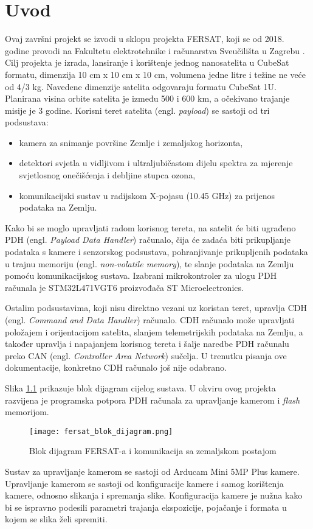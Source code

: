 \chapter{Uvod}

Ovaj završni projekt se izvodi u sklopu projekta FERSAT, koji se od 2018. godine provodi na Fakultetu elektrotehnike i računarstva Sveučilišta u Zagrebu \cite{fersat_stranica_projekta}. Cilj projekta je izrada, lansiranje i korištenje jednog nanosatelita u CubeSat formatu, dimenzija 10 cm x 10 cm x 10 cm, volumena jedne litre i težine ne veće od 4/3 kg. Navedene dimenzije satelita odgovaraju formatu CubeSat 1U. Planirana visina orbite satelita je između 500 i 600 km, a očekivano trajanje misije je 3 godine. Korisni teret satelita (engl. \textit{payload}) se sastoji od tri podsustava:

\begin{itemize}
	\item kamera za snimanje površine Zemlje i zemaljskog horizonta,
	\item detektori svjetla u vidljivom i ultraljubičastom dijelu spektra za mjerenje svjetlosnog onečišćenja i debljine stupca ozona,
	\item komunikacijski sustav u radijskom X-pojasu (10.45 GHz) za prijenos podataka na Zemlju.
\end{itemize}

Kako bi se moglo upravljati radom korisnog tereta, na satelit će biti ugrađeno PDH (engl. \textit{Payload Data Handler}) računalo, čija će zadaća biti prikupljanje podataka s kamere i senzorskog podsustava, pohranjivanje prikupljenih podataka u trajnu memoriju (engl. \textit{non-volatile memory}), te slanje podataka na Zemlju pomoću komunikacijskog sustava. Izabrani mikrokontroler za ulogu PDH računala je STM32L471VGT6 proizvođača ST Microelectronics.

Ostalim podsustavima, koji nisu direktno vezani uz koristan teret, upravlja CDH (engl. \textit{Command and Data Handler}) računalo. CDH računalo može upravljati položajem i orijentacijom satelita, slanjem telemetrijskih podataka na Zemlju, a također upravlja i napajanjem korisnog tereta i šalje naredbe PDH računalu preko CAN (engl. \textit{Controller Area Network}) sučelja. U trenutku pisanja ove dokumentacije, konkretno CDH računalo još nije odabrano.
    
Slika \ref{fig:fersat_blok} prikazuje blok dijagram cijelog sustava. U okviru ovog projekta razvijena je programska potpora PDH računala za upravljanje kamerom i \textit{flash} memorijom.

\begin{figure}[H]
	\centering
	\texttt{[image: fersat\_blok\_dijagram.png]}
	\caption{Blok dijagram FERSAT-a i komunikacija sa zemaljskom postajom \cite{diplomski_goran_petrak}}
	\label{fig:fersat_blok}
\end{figure}

Sustav za upravljanje kamerom se sastoji od Arducam Mini 5MP Plus kamere. Upravljanje kamerom se sastoji od konfiguracije kamere i samog korištenja kamere, odnosno slikanja i spremanja slike. Konfiguracija kamere je nužna kako bi se ispravno podesili parametri trajanja ekspozicije, pojačanje i formata u kojem se slika želi spremiti.